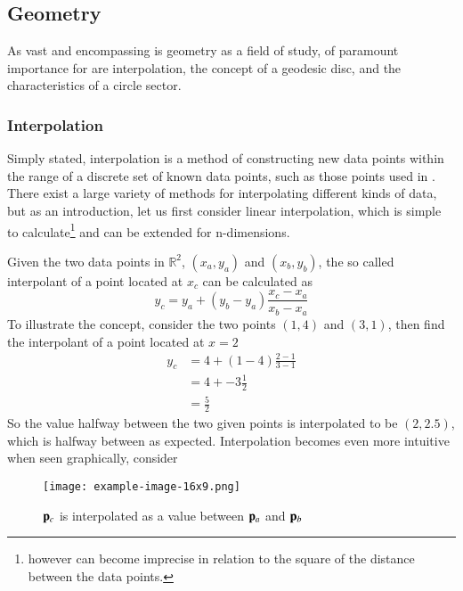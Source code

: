 \subsection{Geometry}
As vast and encompassing is geometry as a field of study, of paramount importance for  are interpolation, the concept of a geodesic disc, and the characteristics of a circle sector.
%
\subsubsection{Interpolation}
Simply stated, interpolation is a method of constructing new data points within the range of a discrete set of known data points, such as those points used in \tdd{}. There exist a large variety of methods for interpolating different kinds of data, but as an introduction, let us first consider linear interpolation, which is simple to calculate\footnote{however can become imprecise in relation to the square of the distance between the data points.} and can be extended for n-dimensions.

Given the two data points in $\mathbb{R}^2$, $(x_a, y_a)$ and $(x_b, y_b)$, the so called interpolant of a point located at $x_c$ can be calculated as
\begin{equation}
	y_c = y_a + (y_b - y_a) \frac{x_c - x_a}{x_b - x_a}
	\label{eq:interpolationGeneral}
\end{equation}
To illustrate the concept, consider the two points $(1, 4)$ and $(3, 1)$, then find the interpolant of a point located at $x = 2$
\begin{align}
	y_c & = 4 + (1 - 4) \frac{2 - 1}{3 - 1} \\
	& = 4 + -3 \frac{1}{2} \\
	& = \frac{5}{2}	
	\label{eq:interpolationSpecific}
\end{align}
So the value halfway between the two given points is interpolated to be $(2, 2.5)$, which is halfway between as expected. Interpolation becomes even more intuitive when seen graphically, consider 
\begin{figure}
\ffigbox
	{\texttt{[image: example-image-16x9.png]}}
	{\caption[Interpolation between two points in $\mathbb{R}^2$]{$\mathbf{p}_c$ is interpolated as a value between $\mathbf{p}_a$ and $\mathbf{p}_b$}\label{fig:interpolation}}
\end{figure}
%

